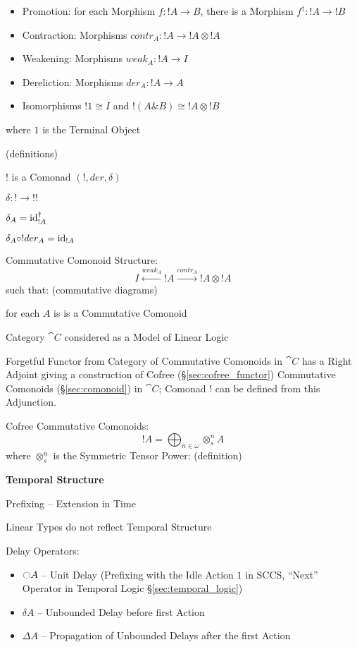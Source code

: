 \begin{itemize}
  \item Promotion: for each Morphism $f : !A \rightarrow B$, there is
    a Morphism $f^\dag : !A \rightarrow !B$
  \item Contraction: Morphisms $contr_A : !A \rightarrow !A \otimes
    !A$
  \item Weakening: Morphisms $weak_A : !A \rightarrow I$
  \item Dereliction: Morphisms $der_A : !A \rightarrow A$
  \item Isomorphisms $!1 \cong I$ and $!(A \& B) \cong !A \otimes !B$
\end{itemize}
where $1$ is the Terminal Object

(definitions) %

$!$ is a Comonad $(!,der,\delta)$

$\delta : ! \rightarrow !!$

$\delta_A = \mathrm{id}_{!A}^\dag$

$\delta_A \circ !der_A = \mathrm{id}_{!A}$

Commutative Comonoid Structure:
\[
  I \xleftarrow{weak_A} !A \xrightarrow{contr_A} !A \otimes !A
\]
such that: (commutative diagrams) %

for each $A$ is is a Commutative Comonoid


Category $\cat{C}$ considered as a Model of Linear Logic

Forgetful Functor from Category of Commutative Comonoids in $\cat{C}$
has a Right Adjoint giving a construction of Cofree
(\S\ref{sec:cofree_functor}) Commutative Comonoids
(\S\ref{sec:comonoid}) in $\cat{C}$; Comonad $!$ can be defined from
this Adjunction.

Cofree Commutative Comonoids:
\[
  !A = \bigoplus_{n \in \omega} \otimes^n_s A
\]
where $\otimes^n_s$ is the Symmetric Tensor Power: (definition) %


\asterism


\textbf{Temporal Structure}

Prefixing -- Extension in Time

Linear Types do not reflect Temporal Structure

Delay Operators:
\begin{itemize}
  \item $\ocircle A$ -- Unit Delay (Prefixing with the Idle Action $1$
    in SCCS, ``Next'' Operator in Temporal Logic
    \S\ref{sec:temporal_logic})
  \item $\delta A$ -- Unbounded Delay before first Action
  \item $\Delta A$ -- Propagation of Unbounded Delays after the first
    Action
\end{itemize}

